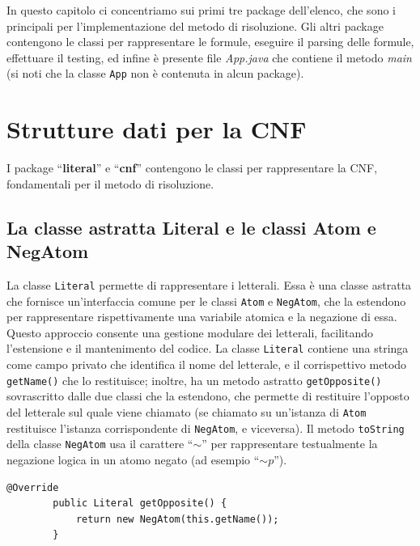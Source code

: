 \documentclass[a4paper,12pt]{report}
\begin{document}
In questo capitolo ci concentriamo sui primi tre package dell'elenco, che sono i principali per l'implementazione del metodo di risoluzione. Gli altri package contengono le classi per rappresentare le formule, eseguire il parsing delle formule, effettuare il testing, ed infine è presente file \emph{App.java} che contiene il metodo \emph{main} (si noti che la classe \texttt{App} non è contenuta in alcun package).


\section{Strutture dati per la CNF}
I package ``\textbf{literal}'' e ``\textbf{cnf}'' contengono le classi per rappresentare la CNF, fondamentali per il metodo di risoluzione.

\subsection{La classe astratta Literal e le classi Atom e NegAtom}
\label{literal}
La classe \texttt{Literal} permette di rappresentare i letterali. Essa è una classe astratta che fornisce un'interfaccia comune per le classi \texttt{Atom} e \texttt{NegAtom}, che la estendono per rappresentare rispettivamente una variabile atomica e la negazione di essa. Questo approccio consente una gestione modulare dei letterali, facilitando l'estensione e il mantenimento del codice. La classe \texttt{Literal} contiene una stringa come campo privato che identifica il nome del letterale, e il corrispettivo metodo \texttt{getName()} che lo restituisce; inoltre, ha un metodo astratto \texttt{getOpposite()} sovrascritto dalle due classi che la estendono, che permette di restituire l'opposto del letterale sul quale viene chiamato (se chiamato su un'istanza di \texttt{Atom} restituisce l'istanza corrispondente di \texttt{NegAtom}, e viceversa). Il metodo \texttt{toString} della classe \texttt{NegAtom} usa il carattere ``\textbf{$\sim $}'' per rappresentare testualmente la negazione logica in un atomo negato (ad esempio ``\emph{$\sim p$}'').

\begin{minipage}{\linewidth}
    \begin{lstlisting}[title={metodo getOpposite sovrascritto dalla classe Atom}]
        @Override
        public Literal getOpposite() {
            return new NegAtom(this.getName());
        }
    \end{lstlisting}
\end{minipage}
\end{document}
